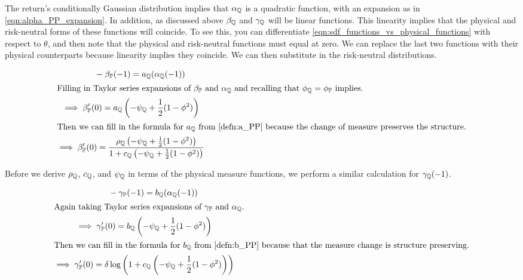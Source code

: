 \documentclass[11pt, letterpaper, twoside, final]{article}
\begin{document}
The return's conditionally Gaussian distribution implies that $\alpha_{\mathbb{Q}}$ is a quadratic function, with an
expansion as in \cref{eqn:alpha_PP_expansion}.
In addition, as discussed above $\beta_{\mathbb{Q}}$ and $\gamma_{\mathbb{Q}}$ will be linear functions. 
This linearity implies that the physical and risk-neutral forms of these functions will coincide. 
To see this, you can differentiate \cref{eqn:sdf_functions_vs_physical_functions} with respect to $\theta$, and
then note that the physical and risk-neutral functions must equal at zero.
We can replace the last two functions with their physical counterparts because linearity implies they
coincide. 
We can then substitute in the risk-neutral distributions.

\begin{gather}
    \label{eqn:beta_qq_at_minus_one}
    \phantom{\implies}   - \beta_{\PP}(-1) = a_{\QQ}(\alpha_{\QQ}(-1))\\
%
    \intertext{Filling in Taylor series expansions of $\beta_{\PP}$ and $\alpha_{\QQ}$ and recalling that
    $\phi_{\QQ} = \phi_{\PP}$ implies.}
%
    \implies \beta_{\PP}'(0) = a_{\QQ}\left(-\psi_{\QQ} + \frac{1}{2} (1- \phi^2)\right)  \\
%
    \intertext{Then we can fill in the formula for $a_{\QQ}$ from \cref{defn:a_PP} because the change of measure
    preserves the structure.}
%
    \implies \beta_{\PP}'(0) = \frac{\rho_{\QQ} \left(-\psi_{\QQ} + \frac{1}{2} (1- \phi^2)\right)}{1 + c_{\QQ}
    \left(-\psi_{\QQ} + \frac{1}{2} (1- \phi^2)\right)} 
    \label{eqn:beta_function_QQ}
\end{gather}

Before we derive $\rho_{\mathbb{Q}}$, $c_{\mathbb{Q}}$, and $\psi_{\mathbb{Q}}$ in terms of the physical measure functions, we perform
a similar calculation for $\gamma_{\mathbb{Q}}(-1)$.

\begin{gather}
    \label{eqn:gamma_qq_at_minus_one}
    \phantom{\implies}   - \gamma_{\PP}(-1) = b_{\QQ}(\alpha_{\QQ}(-1))\\
%
    \intertext{Again taking Taylor series expansions of $\gamma_{\PP}$ and $\alpha_{\QQ}$.}
%
    \implies \gamma_{\PP}'(0) = b_{\QQ}\left(-\psi_{\QQ} + \frac{1}{2} (1- \phi^2)\right)  \\
%
    \intertext{Then we can fill in the formula for $b_{\QQ}$ from \cref{defn:b_PP} because that the measure change
    is structure preserving.}
%
    \implies \gamma_{\PP}'(0) = \delta \log\left(1 + c_{\QQ} \left(-\psi_{\QQ} + \frac{1}{2} (1-
    \phi^2)\right)\right)
    \label{eqn:gamma_function_QQ}
\end{gather}
\end{document}
